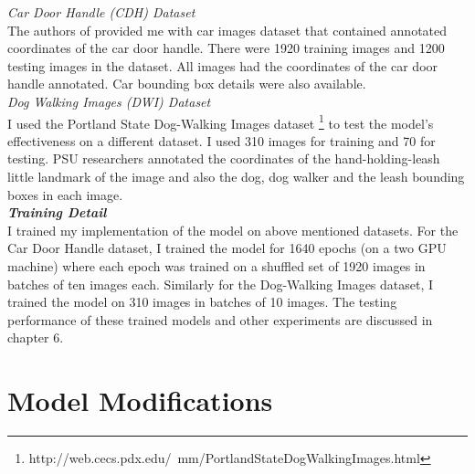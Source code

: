 \documentclass [11pt,letterpaper ,openany ]{report}
\begin{document}
    \noindent
    \textit{Car Door Handle (CDH) Dataset}\\
    The authors of \cite{Singh_2016_CVPR} provided me with car images dataset that contained annotated coordinates of the car door handle. There were 1920 training images and 1200 testing images in the dataset. All images had the coordinates of the car door handle annotated. Car bounding box details were also available.\\

    \noindent
    \textit{Dog Walking Images (DWI) Dataset}\\
    I used the Portland State Dog-Walking Images dataset \footnote {http://web.cecs.pdx.edu/~mm/PortlandStateDogWalkingImages.html} to test the model's effectiveness on a different dataset. I used 310 images for training and 70 for testing. PSU researchers annotated the coordinates of the hand-holding-leash little landmark of the image and also the dog, dog walker and the leash bounding boxes in each image.\\

    \noindent
    \textbf{\textit{Training Detail}}\\
    I trained my implementation of the model on above mentioned datasets. For the Car Door Handle dataset, I trained the model for 1640 epochs (on a two GPU machine) where each epoch was trained on a shuffled set of 1920 images in batches of ten images each. Similarly for the Dog-Walking Images dataset, I trained the model on 310 images in batches of 10 images. The testing performance of these trained models and other experiments are discussed in chapter 6.

    \section{Model Modifications}
\end{document}
